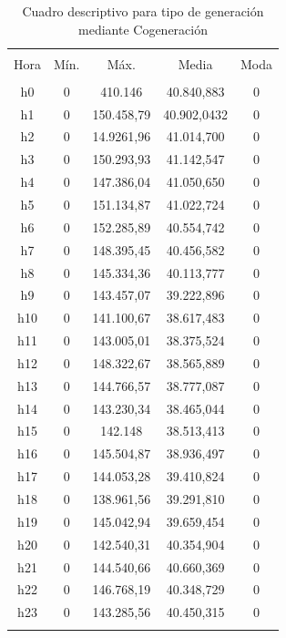 \documentclass[conference, 10pt]{IEEEtran}
\begin{document}
\begin{table}[!htbp] \centering 
  \caption{Cuadro descriptivo para tipo de generación mediante Cogeneración} 
  
\begin{tabular}{@{\extracolsep{5pt}} ccccc} 
\\[-1.8ex]\hline 
\hline \\[-1.8ex] 
Hora & Mín. & Máx. & Media & Moda \\ 
\hline \\[-1.8ex] 
h0 & 0 & 410.146 & 40.840,883 & 0 \\ 
h1 & 0 & 150.458,79 & 40.902,0432& 0 \\ 
h2 & 0 & 14.9261,96 & 41.014,700& 0 \\ 
h3 & 0 & 150.293,93 & 41.142,547& 0 \\ 
h4 & 0 & 147.386,04 & 41.050,650& 0 \\ 
h5 & 0 & 151.134,87 & 41.022,724& 0 \\ 
h6 & 0 & 152.285,89 & 40.554,742& 0 \\ 
h7 & 0 & 148.395,45 & 40.456,582& 0 \\ 
h8 & 0 & 145.334,36 & 40.113,777& 0 \\ 
h9 & 0 & 143.457,07 & 39.222,896& 0 \\ 
h10 & 0 & 141.100,67 & 38.617,483& 0 \\ 
h11 & 0 & 143.005,01 & 38.375,524& 0 \\ 
h12 & 0 & 148.322,67 & 38.565,889& 0 \\ 
h13 & 0 & 144.766,57 & 38.777,087& 0 \\ 
h14 & 0 & 143.230,34 & 38.465,044& 0 \\ 
h15 & 0 & 142.148 & 38.513,413& 0 \\ 
h16 & 0 & 145.504,87 & 38.936,497& 0 \\ 
h17 & 0 & 144.053,28 & 39.410,824& 0 \\ 
h18 & 0 & 138.961,56 & 39.291,810& 0 \\ 
h19 & 0 & 145.042,94 & 39.659,454& 0 \\ 
h20 & 0 & 142.540,31 & 40.354,904& 0 \\ 
h21 & 0 & 144.540,66 & 40.660,369& 0 \\ 
h22 & 0 & 146.768,19 & 40.348,729& 0 \\ 
h23 & 0 & 143.285,56 & 40.450,315& 0 \\ 
\hline \\[-1.8ex] 
\end{tabular} 
\label{tab_15}
\end{table}
\end{document}

